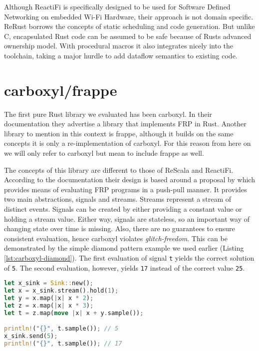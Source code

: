 Although \textsf{ReactiFi} is specifically designed to be used for Software Defined Networking on embedded Wi-Fi Hardware, their approach is not domain specific. \textsf{ReRust} borrows the concepts of static scheduling and code generation. But unlike C, encapsulated Rust code can be assumed to be safe because of Rusts advanced ownership model. With procedural macros it also integrates nicely into the toolchain, taking a major hurdle to add dataflow semantics to existing code.

\section{carboxyl/frappe}
The first pure Rust library we evaluated has been \textsf{carboxyl}. In their documentation they advertise a library that implements \ac{FRP} in Rust. Another library to mention in this context is \textsf{frappe}, although it builds on the same concepts it is only a re-implementation of \textsf{carboxyl}. For this reason from here on we will only refer to \textsf{carboxyl} but mean to include \textsf{frappe} as well.

The concepts of this library are different to those of \textsf{ReScala} and \textsf{ReactiFi}. According to the documentation their design is based around a proposal by \cite{Elliott2009} which provides means of evaluating \ac{FRP} programs in a push-pull manner. It provides two main abstractions, signals and streams. Streams represent a stream of distinct events. Signals can be created by either providing a constant value or holding a stream value. Either way, signals are stateless, so an important way of changing state over time is missing. Also, there are no guarantees to ensure consistent evaluation, hence \textsf{carboxyl} violates \emph{glitch-freedom}. This can be demonstrated by the simple diamond pattern example we used earlier (Listing \ref{lst:carboxyl-diamond}). The first evaluation of signal \texttt{t} yields the correct solution of \texttt{5}. The second evaluation, however, yields \texttt{17} instead of the correct value \texttt{25}.

\begin{lstlisting}[language=Rust,style=colouredRust,caption=Diamond pattern in carboxyl,label=lst:carboxyl-diamond]
let x_sink = Sink::new();
let x = x_sink.stream().hold(1);
let y = x.map(|x| x * 2);
let z = x.map(|x| x * 3);
let t = z.map(move |x| x + y.sample());

println!("{}", t.sample()); // 5
x_sink.send(5);
println!("{}", t.sample()); // 17
\end{lstlisting}

